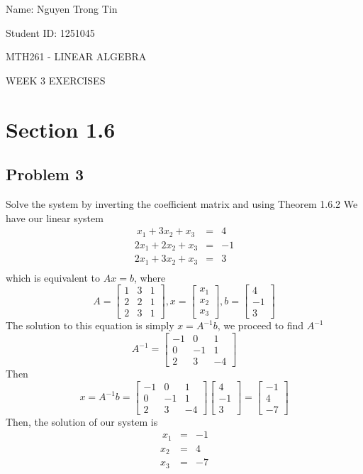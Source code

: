 \documentclass[a4paper,12pt]{report}
\begin{document}
Name: Nguyen Trong Tin

Student ID: 1251045 

\centerline{MTH261 - LINEAR ALGEBRA}
\centerline{WEEK 3 EXERCISES}

\section*{Section 1.6} 
\subsection*{Problem 3}
Solve the system by inverting the coefficient matrix and using Theorem 1.6.2
We have our linear system
\begin{eqnarray*}
\ x_1+3x_2+x_3 & = & 4\\
2x_1 + 2x_2 +x_3& = & -1\\
2x_1 +3x_2+x_3 & = & 3\\
\end{eqnarray*}
which is equivalent to \(Ax=b\), where 
\[
A 
=
\begin{bmatrix}
    1       & 3 & 1 \\
    2       & 2 & 1 \\
    2       & 3 & 1
\end{bmatrix}, 
x
=
\begin{bmatrix}
    x_1       \\
    x_2       \\
    x_3      
\end{bmatrix}
,
b
=
\begin{bmatrix}
    4 \\
    -1 \\
    3 
\end{bmatrix}
\]
The solution to this equation is simply \(x=A^{-1}b\), we proceed to find \(A^{-1}\)
\[
A^{-1}=
\begin{bmatrix}
    -1       & 0 & 1 \\
    0       & -1 & 1\\
    2       & 3 & -4
\end{bmatrix}
\]
Then
\[x=A^{-1}b
=
\begin{bmatrix}
    -1       & 0 & 1 \\
    0       & -1 & 1\\
    2       & 3 & -4
\end{bmatrix}
\begin{bmatrix}
    4    \\
    -1    \\
    3   
\end{bmatrix}
=
\begin{bmatrix}
    -1       \\
    4       \\
    -7       
\end{bmatrix}
\]
Then, the solution of our system is
\begin{eqnarray*}
\ x_1&= & -1\\
x_2 &= & 4\\
x_3 & = & -7\\
\end{eqnarray*}
\end{document}
